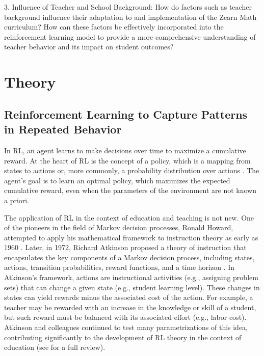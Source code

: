 \documentclass[
  number,
  preprint,
  3p,
  onecolumn]{elsarticle}
\begin{document}
3. Influence of Teacher and School Background: How do factors such as
teacher background influence their adaptation to and implementation of
the Zearn Math curriculum? How can these factors be effectively
incorporated into the reinforcement learning model to provide a more
comprehensive understanding of teacher behavior and its impact on
student outcomes?

\section{Theory}\label{theory}

\subsection{Reinforcement Learning to Capture Patterns in Repeated
Behavior}\label{reinforcement-learning-to-capture-patterns-in-repeated-behavior}

In RL, an agent learns to make decisions over time to maximize a
cumulative reward. At the heart of RL is the concept of a policy, which
is a mapping from states to actions or, more commonly, a probability
distribution over actions \citep{sutton2018}. The agent's goal is to
learn an optimal policy, which maximizes the expected cumulative reward,
even when the parameters of the environment are not known a priori.

The application of RL in the context of education and teaching is not
new. One of the pioneers in the field of Markov decision processes,
Ronald Howard, attempted to apply his mathematical framework to
instruction theory as early as 1960 \citep{howard1960}. Later, in 1972,
Richard Atkinson proposed a theory of instruction that encapsulates the
key components of a Markov decision process, including states, actions,
transition probabilities, reward functions, and a time horizon
\citep{atkinson1972}. In Atkinson's framework, actions are instructional
activities (e.g., assigning problem sets) that can change a given state
(e.g., student learning level). These changes in states can yield
rewards minus the associated cost of the action. For example, a teacher
may be rewarded with an increase in the knowledge or skill of a student,
but such reward must be balanced with its associated effort (e.g., labor
cost). Atkinson and colleagues continued to test many parametrizations
of this idea, contributing significantly to the development of RL theory
in the context of education (see \citep{doroudi2019} for a full review).
\end{document}
